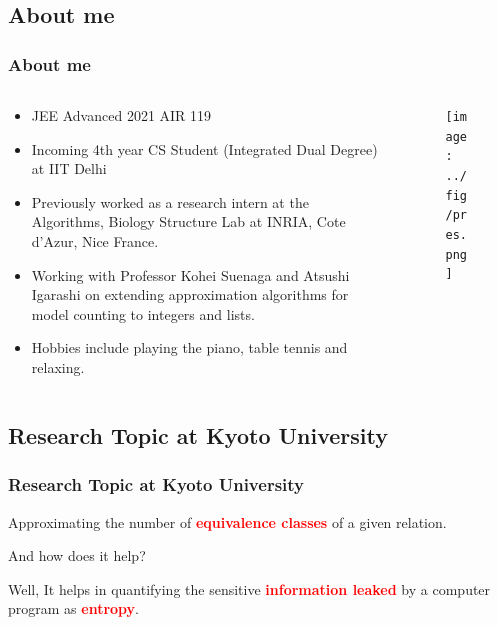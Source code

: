 \documentclass[
	11pt, %
]{beamer}
\begin{document}

\subsection{About me}
\begin{frame}
	\frametitle{About me}
\begin{columns}
	\begin{column}{0.675\textwidth}
		\begin{itemize}
			\item JEE Advanced 2021 AIR 119
			\item Incoming 4th year CS Student (Integrated Dual Degree) at IIT Delhi
			\item Previously worked as a research intern at the Algorithms, Biology Structure Lab at INRIA, Cote d'Azur, Nice France.
			\item Working with Professor Kohei Suenaga and Atsushi Igarashi on extending approximation algorithms for model counting to integers and lists.
			\item Hobbies include playing the piano, table tennis and relaxing.
		\end{itemize}
	\end{column}
	\begin{column}{0.325\textwidth}
	    \begin{figure}
	    \centering
		\texttt{[image: ../fig/pres.png]}
	    \end{figure}
	\end{column}
\end{columns}
	
\end{frame}

\subsection{Research Topic at Kyoto University}
\begin{frame}
	\frametitle{Research Topic at Kyoto University}
Approximating the number of \textcolor{red}{\textbf{equivalence classes}} of a given relation.
	\pause
	\vspace{1cm}
	\begin{center}
	And how does it help? 
	\end{center}
	\pause
	\vspace{1cm}

	\begin{center}
	Well, It helps in quantifying the sensitive \textcolor{red}{\textbf{information leaked}} by a computer program as \textcolor{red}{\textbf{entropy}}.
	\end{center}



\end{frame}
	
\end{document}

